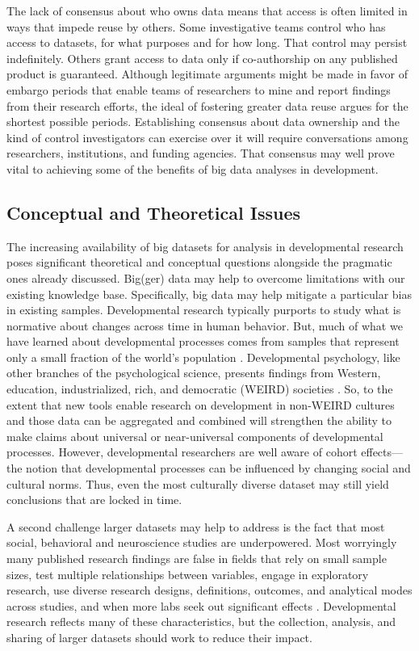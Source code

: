 \documentclass[letterpaper,man,apacite,natbib]{apa6}
\begin{document}
The lack of consensus about who owns data means that access is often limited in ways that impede reuse by others.
Some investigative teams control who has access to datasets, for what purposes and for how long.
That control may persist indefinitely.
Others grant access to data only if co-authorship on any published product is guaranteed.
Although legitimate arguments might be made in favor of embargo periods that enable teams of researchers to mine and report findings from their research efforts, the ideal of fostering greater data reuse argues for the shortest possible periods.
Establishing consensus about data ownership and the kind of control investigators can exercise over it will require conversations among researchers, institutions, and funding agencies.
That consensus may well prove vital to achieving some of the benefits of big data analyses in development. 
\subsection{Conceptual and Theoretical Issues}
The increasing availability of big datasets for analysis in developmental research poses significant theoretical and conceptual questions alongside the pragmatic ones already discussed.
Big(ger) data may help to overcome limitations with our existing knowledge base.
Specifically, big data may help mitigate a particular bias in existing samples.
Developmental research typically purports to study what is normative about changes across time in human behavior.
But, much of what we have learned about developmental processes comes from samples that represent only a small fraction of the world's population \cite{karasik2010weird, fernald2010getting}.
Developmental psychology, like other branches of the psychological science, presents findings from Western, education, industrialized, rich, and democratic (WEIRD) societies \cite{henrich_weirdest_2010}.
So, to the extent that new tools enable research on development in non-WEIRD cultures and those data can be aggregated and combined will strengthen the ability to make claims about universal or near-universal components of developmental processes.
However, developmental researchers are well aware of cohort effects---the notion that developmental processes can be influenced by changing social and cultural norms.
Thus, even the most culturally diverse dataset may still yield conclusions that are locked in time.

A second challenge larger datasets may help to address is the fact that most social, behavioral \cite{maxwell_persistence_2004} and neuroscience studies \cite{button_power_2013} are underpowered.
Most worryingly many published research findings are false in fields that rely on small sample sizes, test multiple relationships between variables, engage in exploratory research, use diverse research designs, definitions, outcomes, and analytical modes across studies, and when more labs seek out significant effects \cite{ioannidis_why_2005}.
Developmental research reflects many of these characteristics, but the collection, analysis, and sharing of larger datasets should work to reduce their impact.
\end{document}
